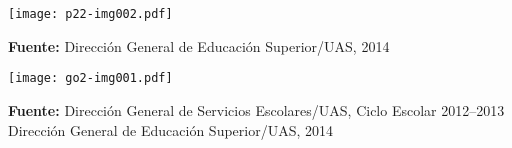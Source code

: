 \smallskip
\texttt{[image: p22-img002.pdf]} 

\scriptsize{{\bfseries Fuente:} Dirección General de Educación Superior\slash{}UAS, 2014}

\medskip
\texttt{[image: go2-img001.pdf]}

\scriptsize{{\bfseries Fuente:} Dirección General de Servicios Escolares\slash{}UAS, Ciclo Escolar 2012--2013\\
Dirección General de Educación Superior\slash{}UAS, 2014}
\newpage
\thispagestyle{empty}
\phantom{abc}